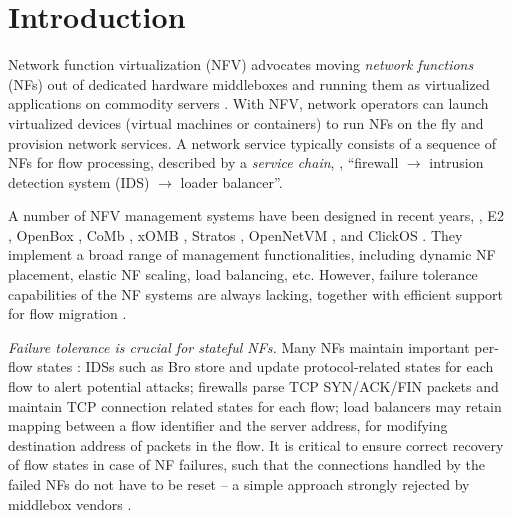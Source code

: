 \section{Introduction}


Network function virtualization (NFV) advocates moving
{\em network functions} (NFs) out of dedicated hardware middleboxes and running them as
virtualized applications on commodity servers \cite{nfv-white-paper}. With NFV, network
operators %
can launch virtualized devices (virtual machines or containers) to run NFs on the fly %
 and provision network services. A network service typically consists of a sequence of NFs for flow processing, described by a {\em service chain}, \eg, ``firewall $\rightarrow$ intrusion detection system (IDS) $\rightarrow$ loader balancer''.

A number of NFV management systems have been designed in recent years, \eg, E2 \cite{palkar2015e2}, OpenBox \cite{OpenBox}, CoMb
\cite{sekar2012design}, xOMB \cite{anderson2012xomb}, Stratos
\cite{gember2012stratos}, OpenNetVM \cite{hwang2015netvm, zhang2016opennetvm}, and ClickOS \cite{martins2014clickos} . They implement a
broad range of management functionalities, including %
 dynamic NF placement, elastic NF scaling,
load balancing, etc. %
 However, failure
tolerance \cite{rajagopalan2013pico, sherry2015rollback} capabilities of the NF systems are always lacking, together with efficient support for flow migration \cite{gember2015opennf, rajagopalan2013split, khalid2016paving}.%

{\em Failure tolerance is crucial for stateful NFs.}  Many NFs maintain important per-flow states \cite{EnablingNF}: IDSs such as Bro \cite{bro} %
 store and update protocol-related states for each flow to alert potential attacks; firewalls \cite{firewall} parse TCP SYN/ACK/FIN packets and maintain TCP connection related states for
each flow; load balancers \cite{lvs} may retain mapping between a flow identifier and
the server address, for modifying destination address of packets in the flow.
It is critical to ensure correct recovery of flow states in case of NF failures, such that the connections handled by the failed NFs do not have to be reset -- a simple approach strongly rejected by middlebox vendors \cite{sherry2015rollback}.

